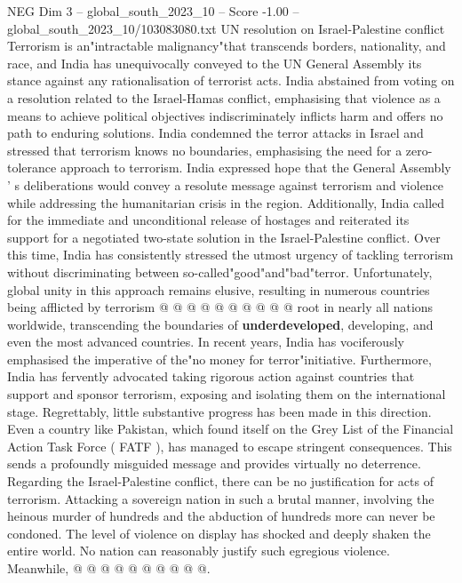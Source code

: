\begin{textsample}{NEG Dim 3 – global\_south\_2023\_10 – Score -1.00 – global\_south\_2023\_10/103083080.txt}  \label{ex:f3_neg_023}
UN resolution on Israel-Palestine conflict Terrorism is an"intractable malignancy"that transcends borders, nationality, and race, and India has unequivocally conveyed to the UN General Assembly its stance against any rationalisation of terrorist acts.
India abstained from voting on a resolution related to the Israel-Hamas conflict, emphasising that violence as a means to achieve political objectives indiscriminately inflicts harm and offers no path to enduring solutions.
India condemned the terror attacks in Israel and stressed that terrorism knows no boundaries, emphasising the need for a zero-tolerance approach to terrorism.
India expressed hope that the General Assembly ' s deliberations would convey a resolute message against terrorism and violence while addressing the humanitarian crisis in the region.
Additionally, India called for the immediate and unconditional release of hostages and reiterated its support for a negotiated two-state solution in the Israel-Palestine conflict.
Over this time, India has consistently stressed the utmost urgency of tackling terrorism without discriminating between so-called"good"and"bad"terror.
Unfortunately, global unity in this approach remains elusive, resulting in numerous countries being afflicted by terrorism @ @ @ @ @ @ @ @ @ @ root in nearly all nations worldwide, transcending the boundaries of \textbf{underdeveloped}, developing, and even the most advanced countries.
In recent years, India has vociferously emphasised the imperative of the"no money for terror"initiative.
Furthermore, India has fervently advocated taking rigorous action against countries that support and sponsor terrorism, exposing and isolating them on the international stage.
Regrettably, little substantive progress has been made in this direction.
Even a country like Pakistan, which found itself on the Grey List of the Financial Action Task Force ( FATF ), has managed to escape stringent consequences.
This sends a profoundly misguided message and provides virtually no deterrence.
Regarding the Israel-Palestine conflict, there can be no justification for acts of terrorism.
Attacking a sovereign nation in such a brutal manner, involving the heinous murder of hundreds and the abduction of hundreds more can never be condoned.
The level of violence on display has shocked and deeply shaken the entire world.
No nation can reasonably justify such egregious violence.
Meanwhile, @ @ @ @ @ @ @ @ @ @.

\end{textsample}
